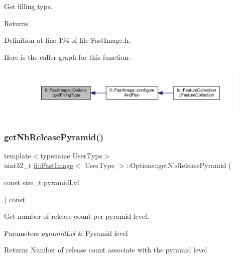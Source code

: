 Get filling type. 

\begin{DoxyReturn}{Returns}

\end{DoxyReturn}


Definition at line 194 of file Fast\+Image.\+h.

Here is the caller graph for this function\+:
\nopagebreak
\begin{figure}[H]
\begin{center}
\leavevmode
\includegraphics[width=350pt]{dc/db9/classfi_1_1FastImage_1_1Options_a876e33a2cd11a1991b0be6a5938e5cc0_icgraph}
\end{center}
\end{figure}
\mbox{\label{classfi_1_1FastImage_1_1Options_ad8ec980d0584b09f7a65e7e502ab8b5e}} 
\subsubsection{\texorpdfstring{get\+Nb\+Release\+Pyramid()}{getNbReleasePyramid()}\hspace{0.1cm}{\footnotesize\ttfamily [1/2]}}
{\footnotesize\ttfamily template$<$typename User\+Type$>$ \\
uint32\+\_\+t \hyperlink{classfi_1_1FastImage}{fi\+::\+Fast\+Image}$<$ User\+Type $>$\+::Options\+::get\+Nb\+Release\+Pyramid (\begin{DoxyParamCaption}\item[{const size\+\_\+t}]{pyramid\+Lvl }\end{DoxyParamCaption}) const\hspace{0.3cm}{\ttfamily [inline]}}



Get number of release count per pyramid level. 


\begin{DoxyParams}{Parameters}
{\em pyramid\+Lvl} & Pyramid level \\
\hline
\end{DoxyParams}
\begin{DoxyReturn}{Returns}
Number of release count associate with the pyramid level 
\end{DoxyReturn}


